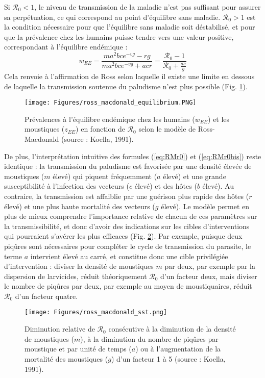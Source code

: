 Si $\mathcal{R}_0<1$, le niveau de transmission de la maladie n'est pas suffisant pour assurer sa perpétuation, ce qui correspond au point d'équilibre sans maladie.
$\mathcal{R}_0 >1$ est la condition nécessaire pour que l'équilibre sans maladie soit déstabilisé, et pour que la prévalence chez les humains puisse tendre vers une valeur positive, correspondant à l'équilibre endémique :
\begin{equation}
w_{EE} = \frac{ma^2bce^{-vg}-rg}{ma^2bce^{-vg}+acr} = \frac{\mathcal{R}_0-1}{\mathcal{R}_0+\frac{ac}{g}}
\end{equation}
Cela renvoie à l'affirmation de Ross selon laquelle il existe une limite en dessous de laquelle la transmission soutenue du paludisme n'est plus possible (Fig. \ref{fig:equilibrium}).

\begin{figure}[t]
	\centering
	\texttt{[image: Figures/ross\_macdonald\_equilibrium.PNG]}
	\caption{Prévalences à l'équilibre endémique chez les humains ($w_{EE}$) et les moustiques ($z_{EE}$) en fonction de $\mathcal{R}_0$ selon le modèle de Ross-Macdonald (source : Koella, 1991).}
	\label{fig:equilibrium}
\end{figure}

De plus, l'interprétation intuitive des formules (\ref{eq:RMr0}) et (\ref{eq:RMr0bis}) reste identique : la transmission du paludisme est favorisée par une densité élevée de moustiques ($m$ élevé) qui piquent fréquemment ($a$ élevé) et une grande susceptibilité à l'infection des vecteurs ($c$ élevé) et des hôtes ($b$ élevé).
Au contraire, la transmission est affaiblie par une guérison plus rapide des hôtes ($r$ élevé) et une plus haute mortalité des vecteurs ($g$ élevé).
Le modèle permet en plus de mieux comprendre l'importance relative de chacun de ces paramètres sur la transmissibilité, et donc d'avoir des indications sur les cibles d'interventions qui pourraient s'avérer les plus efficaces (Fig. \ref{fig:mdsst}).
Par exemple, puisque deux piqûres sont nécessaires pour compléter le cycle de transmission du parasite, le terme $a$ intervient élevé au carré, et constitue donc une cible privilégiée d'intervention : diviser la densité de moustiques $m$ par deux, par exemple par la dispersion de larvicides, réduit théoriquement $\mathcal{R}_0$ d'un facteur deux, mais diviser le nombre de piqûres par deux, par exemple au moyen de moustiquaires, réduit $\mathcal{R}_0$ d'un facteur quatre.

\begin{figure}[t]
	\centering
	\texttt{[image: Figures/ross\_macdonald\_sst.png]}
	\caption{Diminution relative de $\mathcal{R}_0$ consécutive à la diminution de la densité de moustiques ($m$), à la diminution du nombre de piqûres par moustique et par unité de temps ($a$) ou à l'augmentation de la mortalité des moustiques ($g$) d'un facteur 1 à 5 (source : Koella, 1991).}
	\label{fig:mdsst}
\end{figure}


